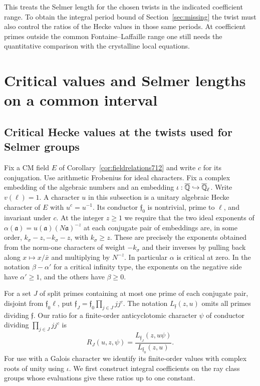 \documentclass[a4paper,11pt]{article}
\theoremstyle{definition}
\theoremstyle{remark}
\numberwithin{equation}{section}
\begin{document}
This treats the Selmer length for the chosen twists in the indicated
coefficient range. To obtain the integral period bound of
Section~\ref{sec:missing} the twist must also control the ratios of
the Hecke values in those same periods. At coefficient primes outside
the common Fontaine--Laffaille range one still needs the quantitative
comparison with the crystalline local equations.
\clearpage

\section{Critical values and Selmer lengths on a common interval}\label{nav:selmer-critical}

\subsection{Critical Hecke values at the twists used for Selmer groups}
\label{sec:samecritical731}

Fix a CM field \(E\) of Corollary~\ref{cor:fieldrelations712} and
write \(c\) for its conjugation. Use arithmetic Frobenius for
ideal characters. Fix a complex embedding of the algebraic numbers
and an embedding \(\iota:\overline{\mathbb Q}\hookrightarrow
\overline{\mathbb Q}_{\ell}\). Write \(v(\ell)=1\). A character \(u\) in
this subsection is a unitary algebraic Hecke character of \(E\) with
\(u^c=u^{-1}\). Its conductor \(\mathfrak f_0\) is nontrivial,
prime to \(\ell\), and invariant under \(c\). At the integer \(z\ge1\)
we require that the two ideal exponents of
\(\alpha(\mathfrak a)=u(\mathfrak a)(N\mathfrak a)^{-z}\)
at each conjugate pair of embeddings are, in some order,
\(k_\sigma-z,-k_\sigma-z\), with \(k_\sigma\ge z\).
These are precisely the exponents obtained from the norm-one
characters of weight \(-k_\sigma\) and their inverses by pulling
back along \(x\mapsto x/\bar x\) and multiplying by \(N^{-z}\).
In particular \(\alpha\) is critical at zero. In the notation
\(\beta-\alpha'\) for a critical infinity type, the exponents on
the negative side have \(\alpha'\ge1\), and the others have
\(\beta\ge0\).

For a set \(J\) of split primes containing at most one prime of each
conjugate pair, disjoint from \(\mathfrak f_0\ell\), put
\(\mathfrak f_J=\mathfrak f_0\prod_{j\in J}jj^c\).
The notation \(L_{\mathfrak f}(z,u)\) omits all primes dividing
\(\mathfrak f\). Our ratio for a finite-order anticyclotomic
character \(\psi\) of conductor dividing \(\prod_{j\in J}jj^c\) is
\[
  R_J(u,z,\psi)=
    \frac{L_{\mathfrak f_J}(z,u\psi)}
         {L_{\mathfrak f_0}(z,u)}.
\]
For use with a Galois character we identify its finite-order values
with complex roots of unity using \(\iota\). We first construct
integral coefficients on the ray class groups whose evaluations give
these ratios up to one constant.
\end{document}
